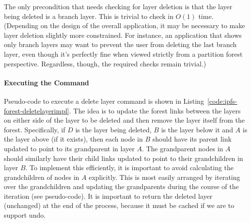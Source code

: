 The only precondition that needs checking for layer deletion is that the layer being deleted is a branch layer. This is trivial to check in $O(1)$ time. (Depending on the design of the overall application, it may be necessary to make layer deletion slightly more constrained. For instance, an application that shows only branch layers may want to prevent the user from deleting the last branch layer, even though it's perfectly fine when viewed strictly from a partition forest perspective. Regardless, though, the required checks remain trivial.)

\paragraph{Executing the Command}

Pseudo-code to execute a delete layer command is shown in Listing~\ref{code:ipfs-forest-deletelayerimpl}. The idea is to update the forest links between the layers on either side of the layer to be deleted and then remove the layer itself from the forest. Specifically, if $D$ is the layer being deleted, $B$ is the layer below it and $A$ is the layer above (if it exists), then each node in $B$ should have its parent link updated to point to its grandparent in layer $A$. The grandparent nodes in $A$ should similarly have their child links updated to point to their grandchildren in layer $B$. To implement this efficiently, it is important to avoid calculating the grandchildren of nodes in $A$ explicitly. This is most easily arranged by iterating over the grandchildren and updating the grandparents during the course of the iteration (see pseudo-code). It is important to return the deleted layer (unchanged) at the end of the process, because it must be cached if we are to support undo.


